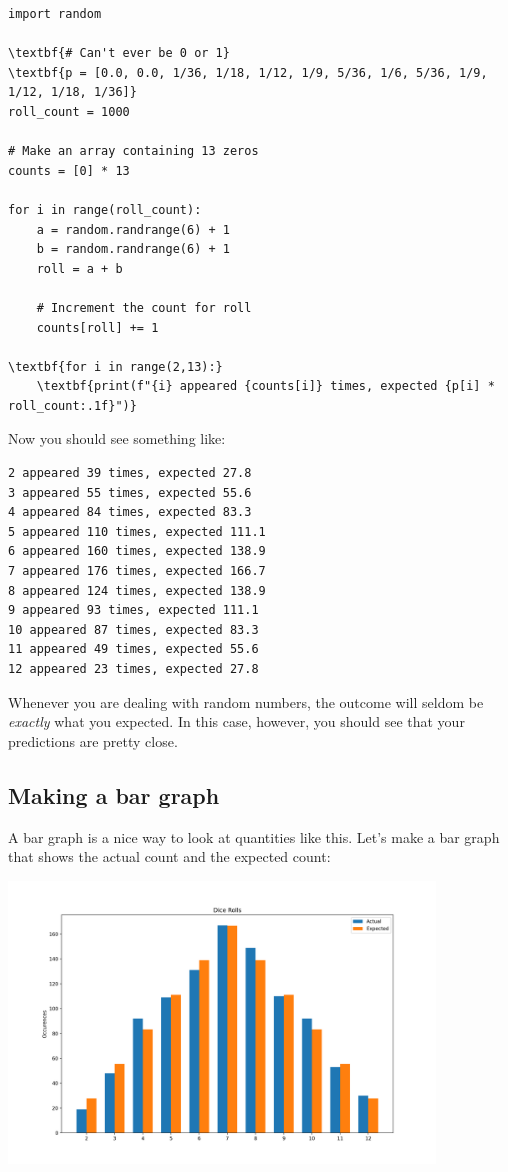 \begin{Verbatim}[commandchars=\\\{\}]
import random

\textbf{# Can't ever be 0 or 1}
\textbf{p = [0.0, 0.0, 1/36, 1/18, 1/12, 1/9, 5/36, 1/6, 5/36, 1/9, 1/12, 1/18, 1/36]}
roll_count = 1000

# Make an array containing 13 zeros
counts = [0] * 13

for i in range(roll_count):
    a = random.randrange(6) + 1
    b = random.randrange(6) + 1
    roll = a + b

    # Increment the count for roll
    counts[roll] += 1

\textbf{for i in range(2,13):}
    \textbf{print(f"{i} appeared {counts[i]} times, expected {p[i] * roll_count:.1f}")}
\end{Verbatim}

Now you should see something like:
\begin{Verbatim}
2 appeared 39 times, expected 27.8
3 appeared 55 times, expected 55.6
4 appeared 84 times, expected 83.3
5 appeared 110 times, expected 111.1
6 appeared 160 times, expected 138.9
7 appeared 176 times, expected 166.7
8 appeared 124 times, expected 138.9
9 appeared 93 times, expected 111.1
10 appeared 87 times, expected 83.3
11 appeared 49 times, expected 55.6
12 appeared 23 times, expected 27.8
\end{Verbatim}

Whenever you are dealing with random numbers, the outcome will seldom
be \textit{exactly} what you expected. In this case, however, you should see that your
predictions are pretty close.

\subsection{Making a bar graph}



A bar graph is a nice way to look at quantities like this.  Let's make a bar graph that shows the actual count and the expected count:


\includegraphics[width= 0.85\textwidth]{dice1.png}

